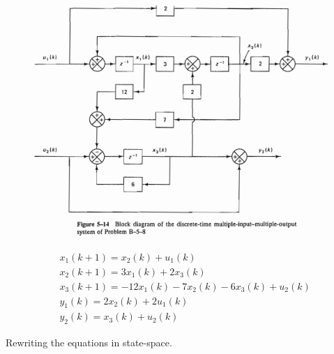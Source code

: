 \begin{figure}[H]
	\centering
	\includegraphics[width=0.6\linewidth]{OgataB-5-8.png}
\end{figure}

\begin{align*}
& x_1(k+1)= x_2(k)+u_1(k) \\
& x_2(k+1)=3x_1(k)+2x_3(k) \\
& x_3(k+1)=-12x_1(k)-7x_2(k)-6x_3(k)+u_2(k) \\
& y_1(k)=2x_2(k)+2u_1(k) \\
& y_2(k)=x_3(k)+u_2(k)
\end{align*}

Rewriting the equations in state-space.

